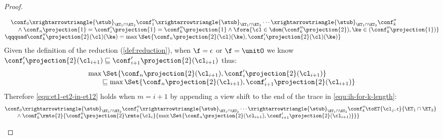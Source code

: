 \begin{proof}
\begin{itemize}
\begin{itemize}
\begin{equation}
    \label{equ:ih-for-k-length}
    \begin{array}{@{}l@{}}
    \quad \conf_0 \xrightarrowtriangle{\stub}_{\ET_1 \cap \ET_2} \conf''_1 \xrightarrowtriangle{\stub}_{\ET_1 \cap \ET_2} \cdots \xrightarrowtriangle{\stub}_{\ET_1 \cap \ET_2} \conf''_k  \\
    \qquad {} \land \conf_n\projection{1} = \conf'_i\projection{1} = \conf''_k\projection{1}
    \land \fora{\cl \in \dom(\conf''_k\projection{2}),\ke \in (\conf''_k\projection{1})} \\
    \qqquad \conf''_k\projection{2}(\cl)(\ke) = \max\Set{\conf_n\projection{2}(\cl)(\ke), \conf'_i\projection{2}(\cl)(\ke)}
\end{array}
\end{equation}
Given the definition of the reduction (\cref{def:reduction}), when \( \f = \epsilon \) or \( \f = \unitO \) we know \( \conf'_i\projection{2}(\cl_{i+1}) \sqsubseteq  \conf'_{i+1}\projection{2}(\cl_{i+1})\) thus:
\begin{equation}
    \label{equ:preserve-max-view}
    \begin{array}{l}
    \max\Set{\conf_n\projection{2}(\cl_{i+1}), \conf'_i\projection{2}(\cl_{i+1})} \\
    \qquad \sqsubseteq \max\Set{\conf_n\projection{2}(\cl_{i+1}), \conf'_{i+1}\projection{2}(\cl_{i+1})} 
    \end{array}
\end{equation}
Therefore \cref{equ:et1-et2-in-et12} holds when \( m = i + 1\) by appending a view shift to the end of the trace in \cref{equ:ih-for-k-length}:
\[
    \begin{array}{@{}l}
    \conf_0 \xrightarrowtriangle{\stub}_{\ET_1 \cap \ET_2} \conf''_1 \xrightarrowtriangle{\stub}_{\ET_1 \cap \ET_2} \cdots
    \xrightarrowtriangle{\stub}_{\ET_1 \cap \ET_2} \conf''_k \toET{\cl_{j}, \epsilon }{\ET_1 \cap \ET_2} \\
    \qquad {} \land \conf''_k\rmto{2}{\conf''_k\projection{2}\rmto{\cl_{i}}{\max\Set{\conf_n\projection{2}(\cl_{i+1}), \conf'_{i+1}\projection{2}(\cl_{i+1})} }}
    \end{array}
\]


\end{itemize}
\end{itemize}
\end{proof}
